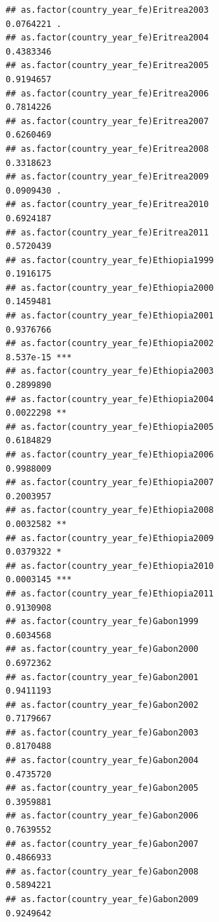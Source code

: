 \documentclass[
  a4paper,
]{article}
\begin{document}
\begin{verbatim}
## as.factor(country_year_fe)Eritrea2003                          0.0764221 .  
## as.factor(country_year_fe)Eritrea2004                          0.4383346    
## as.factor(country_year_fe)Eritrea2005                          0.9194657    
## as.factor(country_year_fe)Eritrea2006                          0.7814226    
## as.factor(country_year_fe)Eritrea2007                          0.6260469    
## as.factor(country_year_fe)Eritrea2008                          0.3318623    
## as.factor(country_year_fe)Eritrea2009                          0.0909430 .  
## as.factor(country_year_fe)Eritrea2010                          0.6924187    
## as.factor(country_year_fe)Eritrea2011                          0.5720439    
## as.factor(country_year_fe)Ethiopia1999                         0.1916175    
## as.factor(country_year_fe)Ethiopia2000                         0.1459481    
## as.factor(country_year_fe)Ethiopia2001                         0.9376766    
## as.factor(country_year_fe)Ethiopia2002                         8.537e-15 ***
## as.factor(country_year_fe)Ethiopia2003                         0.2899890    
## as.factor(country_year_fe)Ethiopia2004                         0.0022298 ** 
## as.factor(country_year_fe)Ethiopia2005                         0.6184829    
## as.factor(country_year_fe)Ethiopia2006                         0.9988009    
## as.factor(country_year_fe)Ethiopia2007                         0.2003957    
## as.factor(country_year_fe)Ethiopia2008                         0.0032582 ** 
## as.factor(country_year_fe)Ethiopia2009                         0.0379322 *  
## as.factor(country_year_fe)Ethiopia2010                         0.0003145 ***
## as.factor(country_year_fe)Ethiopia2011                         0.9130908    
## as.factor(country_year_fe)Gabon1999                            0.6034568    
## as.factor(country_year_fe)Gabon2000                            0.6972362    
## as.factor(country_year_fe)Gabon2001                            0.9411193    
## as.factor(country_year_fe)Gabon2002                            0.7179667    
## as.factor(country_year_fe)Gabon2003                            0.8170488    
## as.factor(country_year_fe)Gabon2004                            0.4735720    
## as.factor(country_year_fe)Gabon2005                            0.3959881    
## as.factor(country_year_fe)Gabon2006                            0.7639552    
## as.factor(country_year_fe)Gabon2007                            0.4866933    
## as.factor(country_year_fe)Gabon2008                            0.5894221    
## as.factor(country_year_fe)Gabon2009                            0.9249642    

\end{verbatim}
\end{document}
